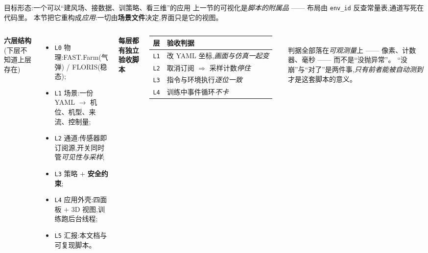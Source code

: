 \documentclass[aspectratio=169,11pt,UTF8]{ctexbeamer}
\newcommand{\emphb}[1]{\textcolor{myred}{\textbf{#1}}}
\begin{document}
\begin{frame}{目标形态:一个可以“建风场、接数据、训策略、看三维”的应用}
\small
上一节的可视化是\emph{脚本的附属品} —— 布局由 \texttt{env\_id} 反查常量表,通道写死在代码里。
本节把它重构成\emph{应用}:一切由\emphb{场景文件}决定,界面只是它的视图。
\begin{columns}[T]
\textbf{六层结构}(下层不知道上层存在)
\begin{itemize}\setlength\itemsep{1pt}
  \item \texttt{L0} 物理:FAST.Farm(气弹) / FLORIS(稳态);
  \item \texttt{L1} 场景:一份 YAML $\to$ 机位、机型、来流、控制量;
  \item \texttt{L2} 通道:传感器即订阅源,开关同时管\emph{可见性与采样};
  \item \texttt{L3} 策略 $+$ \emphb{安全约束};
  \item \texttt{L4} 应用外壳:四面板 $+$ 3D 视图,训练跑后台线程;
  \item \texttt{L5} 汇报:本文档与可复现脚本。
\end{itemize}
\textbf{每层都有独立验收脚本}\\[1mm]
{\footnotesize
\begin{tabular}{@{}ll@{}}
\toprule
层 & 验收判据 \\
\midrule
\texttt{L1} & 改 YAML 坐标,\emph{画面与仿真一起变} \\
\texttt{L2} & 取消订阅 $\Rightarrow$ 采样计数\emph{停住} \\
\texttt{L3} & 指令与环境执行\emph{逐位一致} \\
\texttt{L4} & 训练中事件循环\emph{不卡} \\
\bottomrule
\end{tabular}}\\[1.5mm]
{\footnotesize 判据全部落在\emph{可观测量}上 —— 像素、计数器、毫秒 —— 而不是“没抛异常”。
“没崩”与“对了”是两件事,\emph{只有前者能被自动测到}才是这套脚本的意义。}
\end{columns}
\end{frame}
\end{document}
